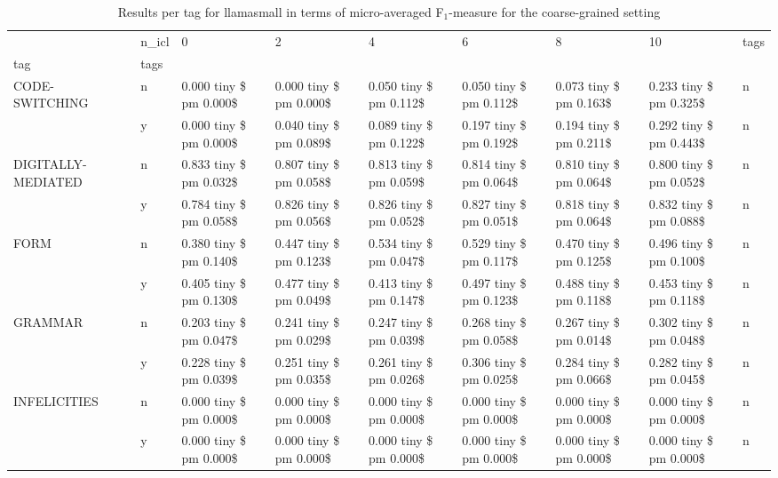 \begin{table}
\caption{Results per tag for llamasmall in terms of micro-averaged F$_1$-measure for the coarse-grained setting}
\label{tab:coarse-tags}
\begin{tabular}{lllllllll}
\toprule
 & n_icl & 0 & 2 & 4 & 6 & 8 & 10 & tags \\
tag & tags &  &  &  &  &  &  &  \\
\midrule
\multirow[t]{2}{*}{CODE-SWITCHING} & n & 0.000 tiny \$ pm 0.000\$ & 0.000 tiny \$ pm 0.000\$ & 0.050 tiny \$ pm 0.112\$ & 0.050 tiny \$ pm 0.112\$ & 0.073 tiny \$ pm 0.163\$ & 0.233 tiny \$ pm 0.325\$ & n \\
 & y & 0.000 tiny \$ pm 0.000\$ & 0.040 tiny \$ pm 0.089\$ & 0.089 tiny \$ pm 0.122\$ & 0.197 tiny \$ pm 0.192\$ & 0.194 tiny \$ pm 0.211\$ & 0.292 tiny \$ pm 0.443\$ & n \\
\cline{1-9}
\multirow[t]{2}{*}{DIGITALLY-MEDIATED} & n & 0.833 tiny \$ pm 0.032\$ & 0.807 tiny \$ pm 0.058\$ & 0.813 tiny \$ pm 0.059\$ & 0.814 tiny \$ pm 0.064\$ & 0.810 tiny \$ pm 0.064\$ & 0.800 tiny \$ pm 0.052\$ & n \\
 & y & 0.784 tiny \$ pm 0.058\$ & 0.826 tiny \$ pm 0.056\$ & 0.826 tiny \$ pm 0.052\$ & 0.827 tiny \$ pm 0.051\$ & 0.818 tiny \$ pm 0.064\$ & 0.832 tiny \$ pm 0.088\$ & n \\
\cline{1-9}
\multirow[t]{2}{*}{FORM} & n & 0.380 tiny \$ pm 0.140\$ & 0.447 tiny \$ pm 0.123\$ & 0.534 tiny \$ pm 0.047\$ & 0.529 tiny \$ pm 0.117\$ & 0.470 tiny \$ pm 0.125\$ & 0.496 tiny \$ pm 0.100\$ & n \\
 & y & 0.405 tiny \$ pm 0.130\$ & 0.477 tiny \$ pm 0.049\$ & 0.413 tiny \$ pm 0.147\$ & 0.497 tiny \$ pm 0.123\$ & 0.488 tiny \$ pm 0.118\$ & 0.453 tiny \$ pm 0.118\$ & n \\
\cline{1-9}
\multirow[t]{2}{*}{GRAMMAR} & n & 0.203 tiny \$ pm 0.047\$ & 0.241 tiny \$ pm 0.029\$ & 0.247 tiny \$ pm 0.039\$ & 0.268 tiny \$ pm 0.058\$ & 0.267 tiny \$ pm 0.014\$ & 0.302 tiny \$ pm 0.048\$ & n \\
 & y & 0.228 tiny \$ pm 0.039\$ & 0.251 tiny \$ pm 0.035\$ & 0.261 tiny \$ pm 0.026\$ & 0.306 tiny \$ pm 0.025\$ & 0.284 tiny \$ pm 0.066\$ & 0.282 tiny \$ pm 0.045\$ & n \\
\cline{1-9}
\multirow[t]{2}{*}{INFELICITIES} & n & 0.000 tiny \$ pm 0.000\$ & 0.000 tiny \$ pm 0.000\$ & 0.000 tiny \$ pm 0.000\$ & 0.000 tiny \$ pm 0.000\$ & 0.000 tiny \$ pm 0.000\$ & 0.000 tiny \$ pm 0.000\$ & n \\
 & y & 0.000 tiny \$ pm 0.000\$ & 0.000 tiny \$ pm 0.000\$ & 0.000 tiny \$ pm 0.000\$ & 0.000 tiny \$ pm 0.000\$ & 0.000 tiny \$ pm 0.000\$ & 0.000 tiny \$ pm 0.000\$ & n \\

\end{tabular}
\end{table}
